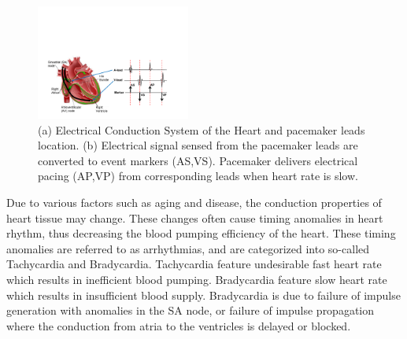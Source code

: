 \begin{figure}
  	\begin{center}
    	\includegraphics[width=0.45\textwidth]{figures/egm.pdf}
  	\end{center}
	\caption{\small (a) Electrical Conduction System of the Heart and pacemaker leads location. (b) Electrical signal sensed from the pacemaker leads are converted to event markers (AS,VS). Pacemaker delivers electrical pacing (AP,VP) from corresponding leads when heart rate is slow.}
	\label{fig:conduction}
\end{figure}
%
%
Due to various factors such as aging and disease, the conduction properties of heart tissue may change. These changes often cause timing anomalies in heart rhythm, thus decreasing the blood pumping efficiency of the heart. These timing anomalies are referred to as arrhythmias, and are categorized into so-called \textsf{Tachycardia} and \textsf{Bradycardia}. Tachycardia feature undesirable fast heart rate which results in inefficient blood pumping. Bradycardia feature slow heart rate which results in insufficient blood supply. Bradycardia is due to failure of impulse generation with anomalies in the SA node, or failure of impulse propagation where the conduction from atria to the ventricles is delayed or blocked. 
